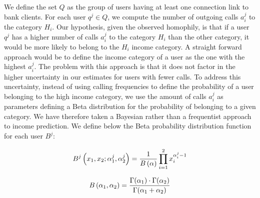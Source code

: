 
We define the set $Q$ as the group of users having at least one connection link to bank clients. For each user $q^j \in Q$, we compute the number of outgoing calls $a^j_i$ to the category $H_i$. Our hypothesis, given the observed homophily, is that if a user $q^j$ has a higher number of calls $a^j_i$ to the category $H_i$ than the other category, it would be more likely to belong to the $H_i$ income category. A straight forward approach would be to define the income category of a user as the one with the highest $a^j_i$. The problem with this approach is that it does not factor in the higher uncertainty in our estimates for users with fewer calls. To address this uncertainty, instead of using calling frequencies to define the probability of a user belonging to the high income category, we use the amount of calls $a^j_i$  as parameters defining a Beta distribution for the probability of belonging to a given category. We have therefore taken a Bayesian rather than a frequentist approach to income prediction. We define below the Beta probability distribution function for each user $B^j$:  


\begin{equation}
B^j \left( x_1, x_2; \alpha^j_1,\alpha^j_2 \right) = \frac{1}{B \left( \alpha \right)} \prod^2_{i = 1} x_i^{\alpha^j_i - 1}
\label{Beta}
\end{equation}


\begin{equation}
B \left( \alpha_1, \alpha_2 \right) = 
\frac{ \Gamma \! \left( \alpha_1 \right) \cdot \Gamma \! \left( \alpha_2 \right)}
{\Gamma \! \left( \alpha_1 + \alpha_2 \right) }
\label{Beta} 
\end{equation}


